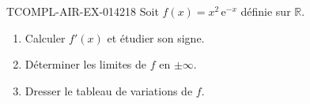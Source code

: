 \begin{exercice}{TCOMPL-AIR-EX-014}{2}{18}
Soit $f(x) = x^2\,\mathrm{e}^{-x}$ définie sur $\mathbb{R}$.
\begin{enumerate}
  \item Calculer $f'(x)$ et étudier son signe.
  \item Déterminer les limites de $f$ en $\pm\infty$.
  \item Dresser le tableau de variations de $f$.
\end{enumerate}

\end{exercice}
